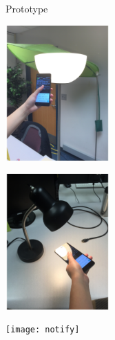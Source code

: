 \documentclass[a0paper,portrait]{baposter}
\begin{document}
\begin{poster}
\begin{posterbox}[name=proto,span=3,column=2,row=0]{Prototype}

\begin{center}
  \begin{minipage}{4cm}
  
  \end{minipage}
  \begin{minipage}{4cm}
  \includegraphics[width=40mm]{light1}
  \end{minipage}
  \begin{minipage}{4cm}
  \includegraphics[width=40mm]{light2}
  \end{minipage}
  \label{fig:light}
\end{center}
\begin{center}
  \begin{minipage}{8cm}
  
  \end{minipage}
  \begin{minipage}{4cm}
  \texttt{[image: notify]}
  \end{minipage}
  \label{fig:notify}
\end{center}
\end{posterbox}


\end{poster}
\end{document}
